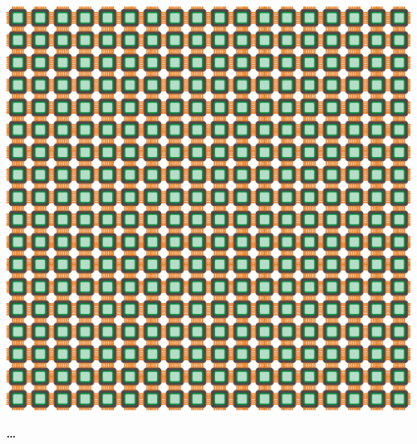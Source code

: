 \documentclass[varwidth=5in]{standalone}
\begin{document}
\noindent\begin{minipage}{\textwidth}
\begin{minipage}{0.8\textwidth}
  \includegraphics[width=\textwidth]{cpugrids/cpu-18.pdf}
\end{minipage}%
\begin{minipage}{0.2\textwidth}
\Huge
\textbf{\dots}
\end{minipage}%
\end{minipage}%

\begin{minipage}{\textwidth}
\begin{minipage}{0.8\textwidth}
\Huge
\centering
{}
\end{minipage}%
\begin{minipage}{0.2\textwidth}
\end{minipage}%
\end{minipage}%
\end{document}
